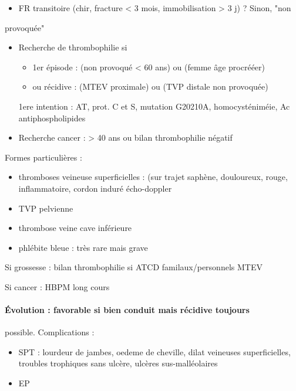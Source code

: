 \documentclass[11pt]{article}
\begin{document}
\begin{itemize}
\item FR transitoire (chir, fracture < 3 mois, immobilisation > 3 j) ? Sinon, "non
\end{itemize}
provoquée"
\begin{itemize}
\item Recherche de thrombophilie si

\begin{itemize}
\item 1er épisode :  (non provoqué < 60 ans) ou (femme âge procrééer)
\item ou récidive : (MTEV proximale) ou (TVP distale non provoquée)
\end{itemize}

\thus 1ere intention : \gls{AT}, prot. C et S, mutation G20210A,
homocysténiméie, Ac antiphospholipides
\item Recherche cancer : > 40 ans ou bilan thrombophilie négatif
\end{itemize}


Formes particulières :

\begin{itemize}
\item thromboses veineuse superficielles : (sur trajet saphène, douloureux,
rouge, inflammatoire, cordon induré \thus écho-doppler
\item TVP pelvienne
\item thrombose veine cave inférieure
\item phlébite bleue : très rare mais grave
\end{itemize}


Si grossesse : bilan thrombophilie si ATCD familaux/personnels MTEV

Si cancer : HBPM long cours

\paragraph{Évolution : favorable si bien conduit mais récidive toujours}
\label{sec:org7e03938}
possible. Complications : 

\begin{itemize}
\item SPT : lourdeur de jambes, oedeme de cheville, dilat veineuses
superficielles, troubles trophiques sans ulcère, ulcères sus-malléolaires
\item EP
\end{itemize}
\end{document}
